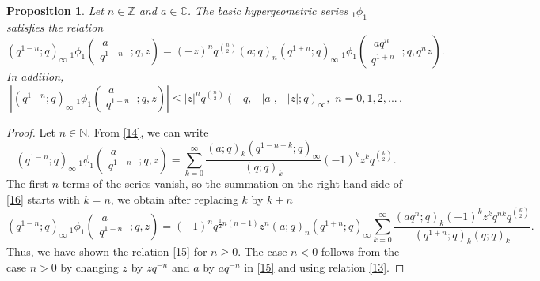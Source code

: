 \documentclass[12pt,a4paper]{amsart}
\numberwithin{equation}{section}
\theoremstyle{plain}
\newtheorem{proposition}[theorem]{Proposition}
\theoremstyle{definition}
\theoremstyle{remark}
\numberwithin{equation}{section}
\numberwithin{table}{section}
\numberwithin{figure}{section}
\begin{document}
\begin{proposition}
Let $n\in \mathbb{Z}$ and $a \in \mathbb{C}$. The basic
hypergeometric series $_{1}\phi_{1}$ satisfies the relation
\begin{equation} (q^{1-n};q)_{\infty} \
_{1}\phi_{1}\left(\begin{matrix} \ a \ \\ q^{1-n} \
\end{matrix};q,z\right)=
(-z)^nq^{\binom{n}{2}}(a;q)_n(q^{1+n};q)_{\infty} \
_{1}\phi_{1}\left(\begin{matrix} \ aq^n \ \\ q^{1+n} \
\end{matrix};q,q^nz \right) \label{15}.
\end{equation}
In addition,
\begin{equation*} |(q^{1-n};q)_{\infty} \
_{1}\phi_{1}\left(\begin{matrix} \ a \ \\ q^{1-n} \
\end{matrix};q,z\right)|\leq
|z|^nq^{\binom{n}{2}}(-q,-|a|,-|z|;q)_{\infty},\,\, n=0,1,2,...\, .
\end{equation*}
\end{proposition}
\begin{proof}
Let $n \in \mathbb{N}.$ From \eqref{14}, we can write
\begin{equation}
(q^{1-n};q)_{\infty}\,_{1}\phi_{1}\left(\begin{matrix} \ a \ \\ q^{1-n} \
\end{matrix};q,z\right)=\sum_{k=0}^{\infty}\frac{(a;q)_k(q^{1-n+k};q)_{\infty}}{(q;q)_k}(-1)^kz^k
q^{\binom{k}{2}} \label{16}.
\end{equation}
The first $n$ terms of the series vanish, so the summation on the right-hand side of \eqref{16} starts with $k=n$, we obtain after replacing
$k$ by $k+n$
\begin{equation*}
(q^{1-n};q)_{\infty}\,_{1}\phi_{1}\left(\begin{matrix} \ a \ \\ q^{1-n} \
\end{matrix};q,z\right)=(-1)^nq^{\frac{1}{2}n(n-1)}z^n(a;q)_n(q^{1+n};q)_{\infty}\sum_{k=0}^{\infty}\frac{(aq^n;q)_k(-1)^kz^kq^{nk}
q^{\binom{k}{2}}}{(q^{1+n};q)_{k}(q;q)_k}.
\end{equation*}
Thus, we have shown the relation \eqref{15} for $n\geq 0$. The case $n<0$
follows from the case $n>0$  by changing $z$ by $zq^{-n}$ and $a$ by
$aq^{-n}$ in \eqref{15} and using relation \eqref{13}.
\end{proof}
\end{document}
